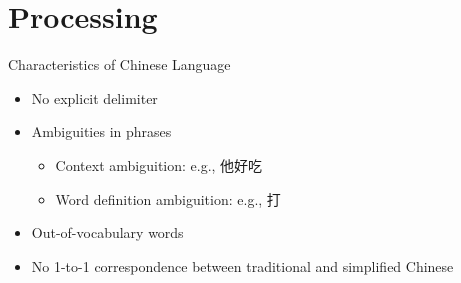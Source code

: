 \documentclass[12pt]{beamer}
\newcommand{\1}[1]{{\mathbf 1}\left\{#1\right\}}        %
\begin{document}

\section{Processing}

\begin{frame}{Characteristics of Chinese Language}

\begin{itemize}[<+->]
\item No explicit delimiter
\item Ambiguities in phrases
	\begin{itemize}
	\item Context ambiguition: e.g., 他好吃
	\item Word definition ambiguition: e.g., 打
	\end{itemize}
\item Out-of-vocabulary words
\item No 1-to-1 correspondence between traditional and simplified Chinese
\end{itemize}

\end{frame}
\end{document}
